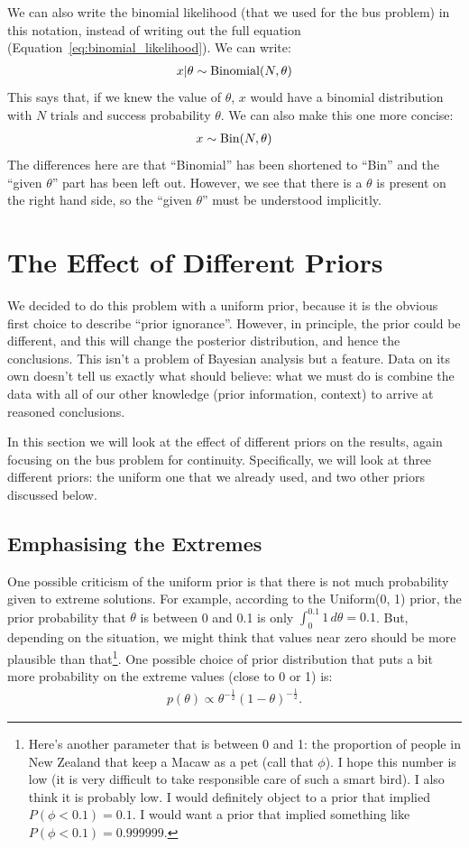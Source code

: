 We can also write the binomial likelihood (that we used for the bus problem)
in this notation, instead of writing out
the full equation (Equation~\ref{eq:binomial_likelihood}). We can write:
\begin{eqnarray}
x | \theta \sim \textnormal{Binomial}(N, \theta)
\end{eqnarray}
This says that, if we knew the value of $\theta$, $x$ would have a binomial
distribution with $N$ trials and success probability $\theta$. We can also
make this one more concise:
\begin{eqnarray}
x \sim \textnormal{Bin}(N, \theta)
\end{eqnarray}
The differences here are that ``Binomial'' has been shortened to ``Bin'' and
the ``given $\theta$'' part has been left out. However, we see that there is
a $\theta$ is present on the right hand side, so the ``given $\theta$'' must
be understood implicitly.

\section{The Effect of Different Priors}
We decided to do this problem with a uniform prior, because it is the obvious
first choice to describe ``prior ignorance''. However, in principle, the prior
could be different, and this will change the posterior distribution, and hence
the conclusions. This isn't a problem of Bayesian analysis but a feature. Data
on its own doesn't tell us exactly what should believe: what we must do is
combine the data with all of our other knowledge (prior information, context)
to arrive at reasoned conclusions.

In this section we will look at the effect of different priors
on the results, again focusing on the bus problem for continuity.
Specifically, we will look at three different priors: the
uniform one that we already used, and two other priors discussed below.

\subsection{Emphasising the Extremes}
One possible criticism of the uniform prior is that there is not much probability
given to extreme solutions. For example, according to the Uniform(0, 1) prior,
the prior probability that $\theta$ is
between 0 and 0.1 is only $\int_0^{0.1} 1 \, d\theta = 0.1$. But, depending on the situation, we might think
that values near zero should be more plausible than
that\footnote{Here's another parameter that is between 0 and 1: the proportion of
people in New Zealand that keep a Macaw as a pet (call that $\phi$).
I hope this number is low
(it is very difficult to take responsible care of such a smart bird). I also
think it is probably low. I would definitely object to a prior that implied
$P(\phi < 0.1) = 0.1$. I would want a prior that implied something like
$P(\phi < 0.1) = 0.999999$.}.
One
possible choice of prior distribution
that puts a bit more probability on the extreme values (close to 0 or 1) is:
\begin{eqnarray}
p(\theta) \propto \theta^{-\frac{1}{2}}(1 - \theta)^{-\frac{1}{2}}.\label{eq:prior2}
\end{eqnarray}


